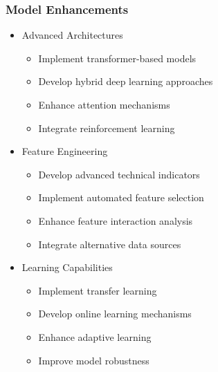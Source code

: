 \documentclass[conference]{IEEEtran}
\begin{document}
\subsubsection{Model Enhancements}
\begin{itemize}
    \item Advanced Architectures
    \begin{itemize}
        \item Implement transformer-based models
        \item Develop hybrid deep learning approaches
        \item Enhance attention mechanisms
        \item Integrate reinforcement learning
    \end{itemize}
    
    \item Feature Engineering
    \begin{itemize}
        \item Develop advanced technical indicators
        \item Implement automated feature selection
        \item Enhance feature interaction analysis
        \item Integrate alternative data sources
    \end{itemize}
    
    \item Learning Capabilities
    \begin{itemize}
        \item Implement transfer learning
        \item Develop online learning mechanisms
        \item Enhance adaptive learning
        \item Improve model robustness
    \end{itemize}
\end{itemize}
\end{document}
